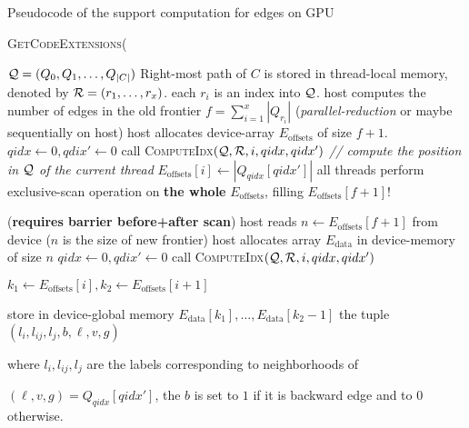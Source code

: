\begin{algorithm}[!htb]
\caption{Pseudocode of the support computation for edges on GPU}
\vbox{\textsc{GetCodeExtensions}(}
\begin{algorithmic}[1]
  \REQUIRE ${\cal Q} = (Q_0, Q_1, \ldots, Q_{|C|})$
  \REQUIRE Right-most path of $C$ is stored in thread-local memory,
           denoted by ${\cal R}=(r_1,\ldots,r_x)$. each $r_i$ is an index into
           ${\cal Q}$.
  \STATE host computes the number of edges in the old frontier
         $f=\sum_{i=1}^x|Q_{r_i}|$ (\emph{parallel-reduction} or maybe
         sequentially on host)
  \STATE host allocates device-array $E_{\text{offsets}}$ of size $f+1$.
  \STATE $qidx\leftarrow 0, qdix'\leftarrow 0$
  \STATE call \textsc{ComputeIdx}$({\cal Q}, {\cal R}, i, qidx, qidx')$ \emph{// compute the position in ${\cal Q}$ of the current thread}
  \STATE $E_{\text{offsets}}[i]\leftarrow |Q_{qidx}[qidx']|$
  \STATE all threads perform exclusive-scan operation on
         \textbf{the whole} $E_{\text{offsets}}$, filling $E_{\text{offsets}}[f+1] !$ \par(\textbf{requires
         barrier before+after scan})
  \ENDFOR
  \STATE host reads $n\leftarrow E_{\text{offsets}}[f+1]$ from device ($n$ is the size of new frontier)
  \STATE host allocates array $E_{\text{data}}$ in device-memory of size $n$
     \STATE $qidx\leftarrow 0, qdix'\leftarrow 0$
     \STATE call \textsc{ComputeIdx}$({\cal Q}, {\cal R}, i, qidx, qidx')$

     \STATE $k_1\leftarrow E_{\text{offsets}}[i], k_2\leftarrow E_{\text{offsets}}[i+1]$
\medskip

     \STATE store in device-global memory $E_{\text{data}}[k_1],\ldots,E_{\text{data}}[k_2-1]$
            the tuple $(l_i, l_{ij}, l_j, b, \ell, v, g)$ \par where
            $l_i,l_{ij}, l_j$ are the labels corresponding to neighborhoods
            of\par\noindent $(\ell,v,g)=Q_{qidx}[qidx']$, the $b$ is set to $1$
            if it is backward edge and to $0$ otherwise.


\end{algorithmic}
\end{algorithm}
